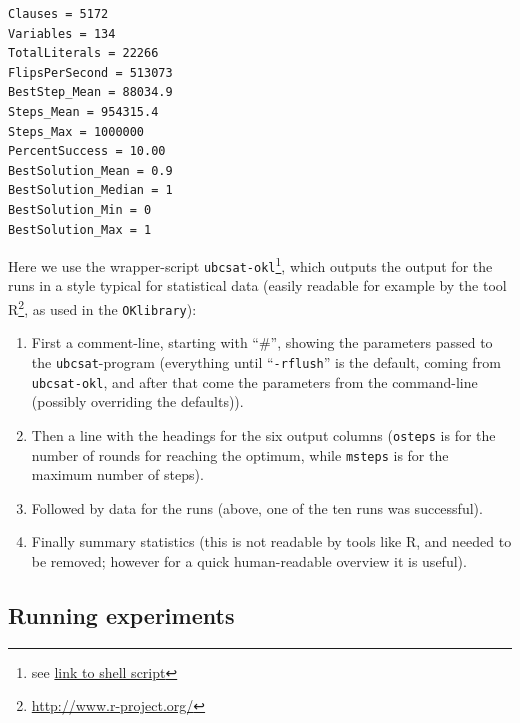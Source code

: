 \documentclass[final,3p,times]{elsarticle}
\theoremstyle{definition}
\newcommand{\OKlibrary}{\texttt{OKlibrary}}
\begin{document}
\begin{appendix}
\begin{verbatim}
Clauses = 5172
Variables = 134
TotalLiterals = 22266
FlipsPerSecond = 513073
BestStep_Mean = 88034.9
Steps_Mean = 954315.4
Steps_Max = 1000000
PercentSuccess = 10.00
BestSolution_Mean = 0.9
BestSolution_Median = 1
BestSolution_Min = 0
BestSolution_Max = 1
\end{verbatim}
Here we use the wrapper-script \texttt{ubcsat-okl}\footnote{see \href{https://github.com/OKullmann/oklibrary/blob/master/Experimentation/ExperimentSystem/ControllingLocalSearch/ubcsat-okl}{link to shell script}}, which outputs the output for the runs in a style typical for statistical data (easily readable for example by the tool R\footnote{\url{http://www.r-project.org/}}, as used in the \OKlibrary):
\begin{enumerate}
\item First a comment-line, starting with ``\#'', showing the parameters passed to the \texttt{ubcsat}-program (everything until ``\texttt{-rflush}'' is the default, coming from \texttt{ubcsat-okl}, and after that come the parameters from the command-line (possibly overriding the defaults)).
\item Then a line with the headings for the six output columns (\texttt{osteps} is for the number of rounds for reaching the optimum, while \texttt{msteps} is for the maximum number of steps).
\item Followed by data for the runs (above, one of the ten runs was successful).
\item Finally summary statistics (this is not readable by tools like R, and needed to be removed; however for a quick human-readable overview it is useful).
\end{enumerate}



\subsection{Running experiments}
\label{sec:OKlexperiments}



\end{appendix}
\end{document}
